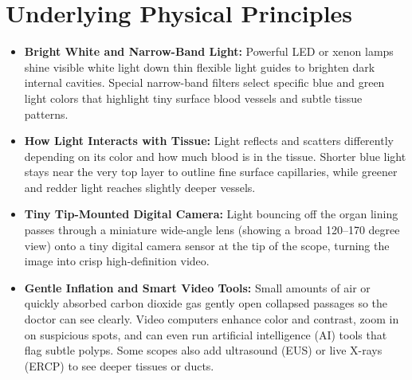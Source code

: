 \section{Underlying Physical Principles}
\begin{itemize}
\item \textbf{Bright White and Narrow-Band Light:} Powerful LED or xenon lamps shine visible white light down thin flexible light guides to brighten dark internal cavities. Special narrow-band filters select specific blue and green light colors that highlight tiny surface blood vessels and subtle tissue patterns.
\item \textbf{How Light Interacts with Tissue:} Light reflects and scatters differently depending on its color and how much blood is in the tissue. Shorter blue light stays near the very top layer to outline fine surface capillaries, while greener and redder light reaches slightly deeper vessels.
\item \textbf{Tiny Tip-Mounted Digital Camera:} Light bouncing off the organ lining passes through a miniature wide-angle lens (showing a broad 120--170 degree view) onto a tiny digital camera sensor at the tip of the scope, turning the image into crisp high-definition video.
\item \textbf{Gentle Inflation and Smart Video Tools:} Small amounts of air or quickly absorbed carbon dioxide gas gently open collapsed passages so the doctor can see clearly. Video computers enhance color and contrast, zoom in on suspicious spots, and can even run artificial intelligence (AI) tools that flag subtle polyps. Some scopes also add ultrasound (EUS) or live X-rays (ERCP) to see deeper tissues or ducts.
\end{itemize}


